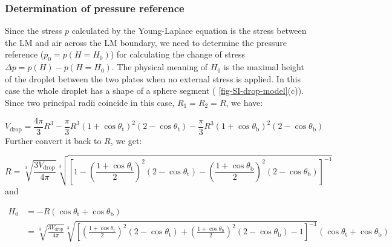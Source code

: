 \subsubsection{Determination of pressure reference}
\label{sec:small-orgdade735}
Since the stress \(p\) calculated by the Young-Laplace equation is
the stress between the LM and air across the LM boundary, we need
to determine the pressure reference (\(p_{0} = p(H=H_{0})\)) for
calculating the change of stress \(\Delta p=p(H) - p(H=H_{0})\). The
physical meaning of \(H_{0}\) is the maximal height of the droplet
between the two plates when no external stress is applied. In this
case the whole droplet has a shape of a sphere segment (
\autoref{fig-SI-drop-model}(c)). Since two principal radii coincide in this
case, \(R_{1}=R_{2}=R\), we have:

\begin{equation}
\label{eq:small-5}
V_{\mathrm{drop}} = \frac{4 \pi}{3} R^{3} - \frac{\pi}{3} R^{3} (1 + \cos \theta_{\mathrm{t}})^{2}(2 - \cos \theta_{\mathrm{t}})
                                          - \frac{\pi}{3} R^{3} (1 + \cos \theta_{\mathrm{b}})^{2}(2 - \cos \theta_{\mathrm{b}})
\end{equation}
Further convert it back to \(R\), we get:

\begin{equation}
\label{eq:small-8}
R = \sqrt[3]{\frac{3 V_{\mathrm{drop}}}{4 \pi}} \sqrt[3]{\left[ 
1 - \left(\frac{1 + \cos \theta_{\mathrm{t}}}{2} \right)^{2} \left(2 - \cos \theta_{\mathrm{t}}\right)
- \left(\frac{1 + \cos \theta_{\mathrm{b}}}{2} \right)^{2} \left(2 - \cos \theta_{\mathrm{b}}\right)
\right]^{-1}}
\end{equation}
and

 \begin{equation}
 \label{eq:small-9}
 \begin{aligned}
 H_{0} &= -R(\cos \theta_{\mathrm{t}} + \cos \theta_{\mathrm{b}})  \\
 &= \sqrt[3]{\frac{3 V_{\mathrm{drop}}}{4 \pi}} \sqrt[3]{\left[ 
\left(\frac{1 + \cos \theta_{\mathrm{t}}}{2} \right)^{2} \left(2 - \cos \theta_{\mathrm{t}}\right) +
 \left(\frac{1 + \cos \theta_{\mathrm{b}}}{2} \right)^{2} \left(2 - \cos \theta_{\mathrm{b}}\right) -1 
 \right]^{-1}}  \left(\cos \theta_{\mathrm{t}} + \cos \theta_{\mathrm{b}}\right)
 \end{aligned}
 \end{equation}



